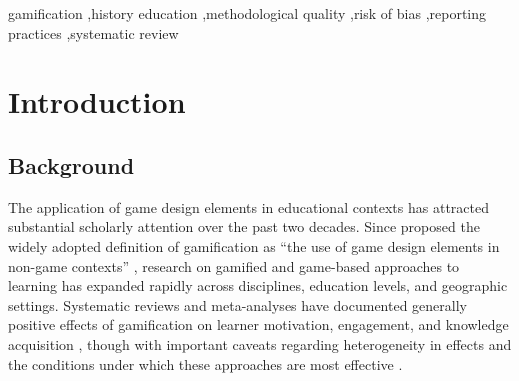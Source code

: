 \documentclass[etq]{acnsart}
\begin{document}
	
	
	\begin{keywords}
		gamification \sep history education \sep methodological quality \sep risk of bias \sep reporting practices \sep systematic review
	\end{keywords}
	
	\maketitle
	
	
	
	\section{Introduction}
	\label{sec:introduction}
	
	\subsection{Background}
	\label{sec:intro_background}
	
	The application of game design elements in educational contexts has attracted substantial scholarly attention over the past two decades. Since \citet{Deterding2011} proposed the widely adopted definition of gamification as ``the use of game design elements in non-game contexts'' \cite[p.~9]{Deterding2011}, research on gamified and game-based approaches to learning has expanded rapidly across disciplines, education levels, and geographic settings. Systematic reviews and meta-analyses have documented generally positive effects of gamification on learner motivation, engagement, and knowledge acquisition \cite{Hamari2014, Sailer2017, Connolly2012}, though with important caveats regarding heterogeneity in effects and the conditions under which these approaches are most effective \cite{Clark2016, DichevDicheva2017}.
	
\end{document}
